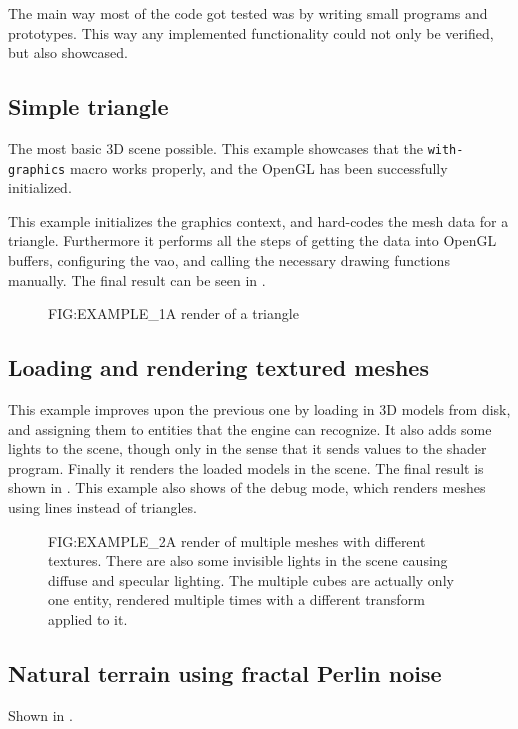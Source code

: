
The main way most of the code got tested was by writing small programs and prototypes.
This way any implemented functionality could not only be verified,
but also showcased.

\subsection{Simple triangle}

The most basic 3D scene possible.
This example showcases that the \texttt{with-graphics} macro works properly,
and the OpenGL has been successfully initialized.

This example initializes the graphics context,
and hard-codes the mesh data for a triangle.
Furthermore it performs all the steps of getting the data into OpenGL buffers,
configuring the \ac{vao},
and calling the necessary drawing functions manually.
The final result can be seen in .

\begin{figure}[Exploratory tests \textemdash Triangle]{FIG:EXAMPLE_1}{A render of a triangle}
\end{figure}

\subsection{Loading and rendering textured meshes}

This example improves upon the previous one by loading in 3D models from disk,
and assigning them to entities that the engine can recognize.
It also adds some lights to the scene,
though only in the sense that it sends values to the shader program.
Finally it renders the loaded models in the scene.
The final result is shown in .
This example also shows of the debug mode,
which renders meshes using lines instead of triangles.

\begin{figure}[Exploratory tests \textemdash Meshes]{FIG:EXAMPLE_2}{A render of multiple meshes with different textures. There are also some invisible lights in the scene causing diffuse and specular lighting. The multiple cubes are actually only one entity, rendered multiple times with a different transform applied to it.}
\end{figure}

\subsection{Natural terrain using fractal Perlin noise}

Shown in .


